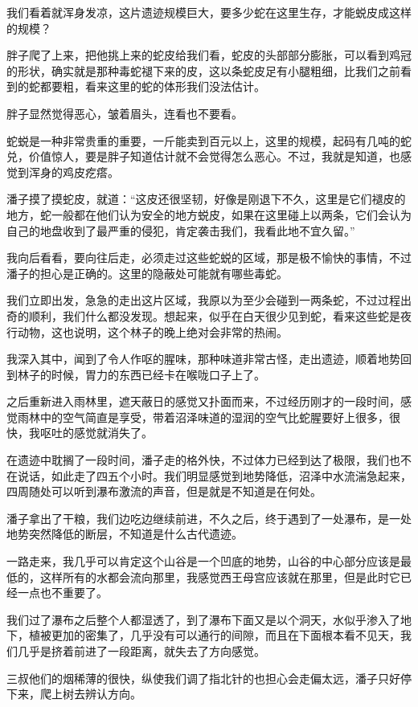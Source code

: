 我们看着就浑身发凉，这片遗迹规模巨大，要多少蛇在这里生存，才能蜕皮成这样的规模？

胖子爬了上来，把他挑上来的蛇皮给我们看，蛇皮的头部部分膨胀，可以看到鸡冠的形状，确实就是那种毒蛇褪下来的皮，这以条蛇皮足有小腿粗细，比我们之前看到的蛇都要粗，看来这里的蛇的体形我们没法估计。

胖子显然觉得恶心，皱着眉头，连看也不要看。

蛇蜕是一种非常贵重的重要，一斤能卖到百元以上，这里的规模，起码有几吨的蛇兑，价值惊人，要是胖子知道估计就不会觉得怎么恶心。不过，我就是知道，也感觉到浑身的鸡皮疙瘩。

潘子摸了摸蛇皮，就道：“这皮还很坚韧，好像是刚退下不久，这里是它们褪皮的地方，蛇一般都在他们认为安全的地方蜕皮，如果在这里碰上以两条，它们会认为自己的地盘收到了最严重的侵犯，肯定袭击我们，我看此地不宜久留。”

我向后看看，要向往后走，必须走过这些蛇蜕的区域，那是极不愉快的事情，不过潘子的担心是正确的。这里的隐蔽处可能就有哪些毒蛇。

我们立即出发，急急的走出这片区域，我原以为至少会碰到一两条蛇，不过过程出奇的顺利，我们什么都没发现。想起来，似乎在白天很少见到蛇，看来这些蛇是夜行动物，这也说明，这个林子的晚上绝对会非常的热闹。

我深入其中，闻到了令人作呕的腥味，那种味道非常古怪，走出遗迹，顺着地势回到林子的时候，胃力的东西已经卡在喉咙口子上了。

之后重新进入雨林里，遮天蔽日的感觉又扑面而来，不过经历刚才的一段时间，感觉雨林中的空气简直是享受，带着沼泽味道的湿润的空气比蛇腥要好上很多，很快，我呕吐的感觉就消失了。

在遗迹中耽搁了一段时间，潘子走的格外快，不过体力已经到达了极限，我们也不在说话，如此走了四五个小时。我们明显感觉到地势降低，沼泽中水流湍急起来，四周随处可以听到瀑布激流的声音，但是就是不知道是在何处。

潘子拿出了干粮，我们边吃边继续前进，不久之后，终于遇到了一处瀑布，是一处地势突然降低的断层，不知道是什么古代遗迹。

一路走来，我几乎可以肯定这个山谷是一个凹底的地势，山谷的中心部分应该是最低的，这样所有的水都会流向那里，我感觉西王母宫应该就在那里，但是此时它已经一点也不重要了。

我们过了瀑布之后整个人都湿透了，到了瀑布下面又是以个洞天，水似乎渗入了地下，植被更加的密集了，几乎没有可以通行的间隙，而且在下面根本看不见天，我们几乎是挤着前进了一段距离，就失去了方向感觉。

三叔他们的烟稀薄的很快，纵使我们调了指北针的也担心会走偏太远，潘子只好停下来，爬上树去辨认方向。

